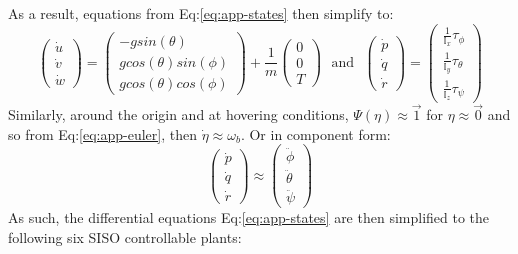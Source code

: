 As a result, equations from Eq:\ref{eq:app-states} then simplify to:
\begin{equation}
\begin{pmatrix}
\dot{u}\\
\dot{v}\\
\dot{w}
\end{pmatrix}
=
\begin{pmatrix}
-g sin(\theta)\\
g cos(\theta)sin(\phi)\\
g cos(\theta)cos(\phi)
\end{pmatrix}
+
\frac{1}{m}\begin{pmatrix}
0\\
0\\
T
\end{pmatrix}
~~~\text{and}~~~
\begin{pmatrix}
\dot{p}\\
\dot{q}\\
\dot{r}
\end{pmatrix}
=
\begin{pmatrix}
\frac{1}{\mathbb{I}_x}\tau_\phi\\
\frac{1}{\mathbb{I}_y}\tau_\theta\\
\frac{1}{\mathbb{I}_z}\tau_\psi
\end{pmatrix}
\end{equation}
Similarly, around the origin and at hovering conditions, $\Psi(\eta)\approx\vec{1}$ for $\eta\approx\vec{0}$ and so from Eq:\ref{eq:app-euler}, then $\dot{\eta}\approx\omega_b$. Or in component form:
\begin{equation}
\begin{pmatrix}
\dot{p}\\
\dot{q}\\
\dot{r}
\end{pmatrix}
\approx
\begin{pmatrix}
\ddot{\phi}\\
\ddot{\theta}\\
\ddot{\psi}
\end{pmatrix}
\end{equation}
As such, the differential equations Eq:\ref{eq:app-states} are then simplified to the following six SISO controllable plants:
